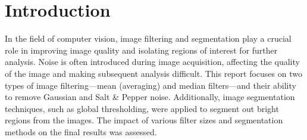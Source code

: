 \documentclass[11pt,letterpaper,twocolumn]{article}
\begin{document}
\section{Introduction}
\justify
In the field of computer vision, image filtering and segmentation play a crucial role in improving image quality and isolating regions of interest for further analysis. Noise is often introduced during image acquisition, affecting the quality of the image and making subsequent analysis difficult. This report focuses on two types of image filtering—mean (averaging) and median filters—and their ability to remove Gaussian and Salt \& Pepper noise. Additionally, image segmentation techniques, such as global thresholding, were applied to segment out bright regions from the images. The impact of various filter sizes and segmentation methods on the final results was assessed.\par \vspace{5mm}  


\end{document}

